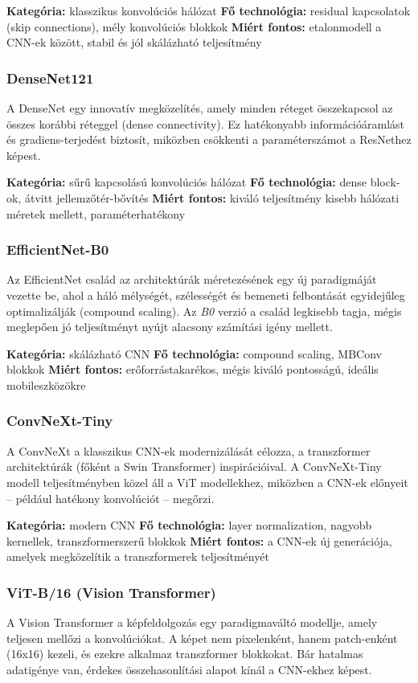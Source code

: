 \textbf{Kategória:} klasszikus konvolúciós hálózat  
\textbf{Fő technológia:} residual kapcsolatok (skip connections), mély konvolúciós blokkok  
\textbf{Miért fontos:} etalonmodell a CNN-ek között, stabil és jól skálázható teljesítmény

\subsubsection{DenseNet121}
A DenseNet egy innovatív megközelítés, amely minden réteget összekapcsol az összes korábbi réteggel (dense connectivity). Ez hatékonyabb információáramlást és gradiens-terjedést biztosít, miközben csökkenti a paraméterszámot a ResNethez képest.

\textbf{Kategória:} sűrű kapcsolású konvolúciós hálózat  
\textbf{Fő technológia:} dense block-ok, átvitt jellemzőtér-bővítés  
\textbf{Miért fontos:} kiváló teljesítmény kisebb hálózati méretek mellett, paraméterhatékony

\subsubsection{EfficientNet-B0}
Az EfficientNet család az architektúrák méretezésének egy új paradigmáját vezette be, ahol a háló mélységét, szélességét és bemeneti felbontását egyidejűleg optimalizálják (compound scaling). Az \textit{B0} verzió a család legkisebb tagja, mégis meglepően jó teljesítményt nyújt alacsony számítási igény mellett.

\textbf{Kategória:} skálázható CNN  
\textbf{Fő technológia:} compound scaling, MBConv blokkok  
\textbf{Miért fontos:} erőforrástakarékos, mégis kiváló pontosságú, ideális mobileszközökre

\subsubsection{ConvNeXt-Tiny}
A ConvNeXt a klasszikus CNN-ek modernizálását célozza, a transzformer architektúrák (főként a Swin Transformer) inspirációival. A ConvNeXt-Tiny modell teljesítményben közel áll a ViT modellekhez, miközben a CNN-ek előnyeit – például hatékony konvolúciót – megőrzi.

\textbf{Kategória:} modern CNN  
\textbf{Fő technológia:} layer normalization, nagyobb kernellek, transzformerszerű blokkok  
\textbf{Miért fontos:} a CNN-ek új generációja, amelyek megközelítik a transzformerek teljesítményét

\subsubsection{ViT-B/16 (Vision Transformer)}
A Vision Transformer a képfeldolgozás egy paradigmaváltó modellje, amely teljesen mellőzi a konvolúciókat. A képet nem pixelenként, hanem patch-enként (16x16) kezeli, és ezekre alkalmaz transzformer blokkokat. Bár hatalmas adatigénye van, érdekes összehasonlítási alapot kínál a CNN-ekhez képest.

